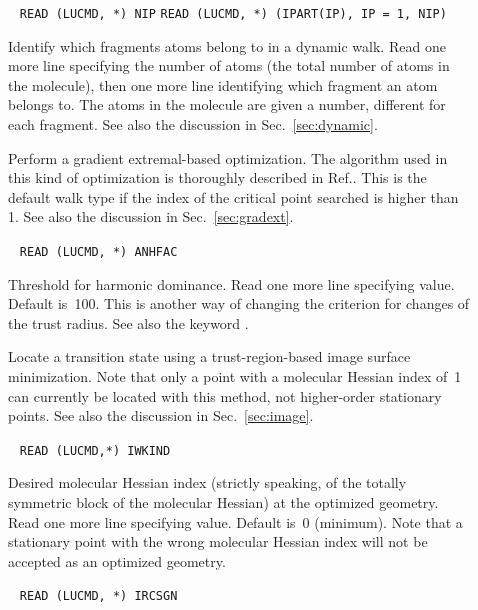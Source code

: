 \begin{description}
\item[]\verb| |\newline
\verb|READ (LUCMD, *) NIP|\newline
\verb|READ (LUCMD, *) (IPART(IP), IP = 1, NIP)|

Identify which fragments atoms belong to in
a dynamic walk.  Read one more line specifying the number of
atoms (the total number of atoms in the molecule), then one more
line identifying which fragment an atom belongs to. The atoms in the
molecule are given a number, different for each fragment. See also the
discussion in Sec.~\ref{sec:dynamic}.

\item[] Perform a gradient extremal-based optimization. The algorithm used in this kind of optimization is
thoroughly described in Ref.\cite{pjhjajthtca73}. This is the default walk
type if the  index of the critical point searched is higher than
1. See also the discussion in Sec.~\ref{sec:gradext}.

\item[]\verb| |\newline
\verb|READ (LUCMD, *) ANHFAC|

Threshold for harmonic dominance.  Read one
more line specifying value. Default is~100. This is  another
way of changing the criterion for changes of the trust
radius. See also the keyword .

\item[] Locate a transition state using a
trust-region-based image surface minimization.
Note that only a
point with a molecular Hessian index of~1 can currently be located with this
method, not higher-order stationary points. See also the discussion in
Sec.~\ref{sec:image}.

\item[]\verb| |\newline
\verb|READ (LUCMD,*) IWKIND|

Desired molecular Hessian index (strictly speaking, of the
totally symmetric block of the molecular Hessian) at the optimized geometry.
Read one more line specifying value.  Default is~0 (minimum).
Note that a stationary point with the wrong molecular Hessian index will not
be accepted as an optimized geometry.

\item[]\verb| |\newline
\verb|READ (LUCMD, *) IRCSGN|


\end{description}

